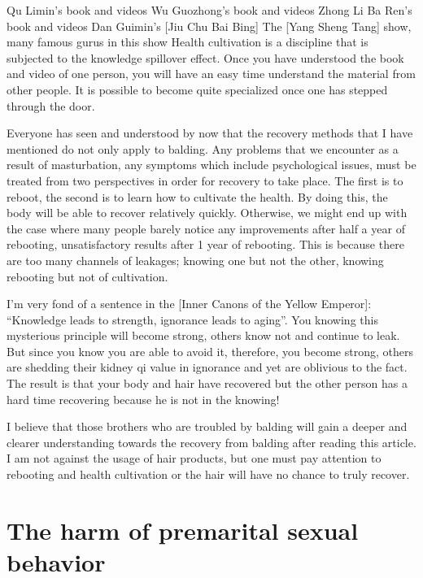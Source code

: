 \documentclass[
]{book}
\begin{document}
Qu Limin's book and videos
Wu Guozhong's book and videos
Zhong Li Ba Ren's book and videos
Dan Guimin's {[}Jiu Chu Bai Bing{]}
The {[}Yang Sheng Tang{]} show, many famous gurus in this show
Health cultivation is a discipline that is subjected to the knowledge spillover effect. Once you have understood the book and video of one person, you will have an easy time understand the material from other people. It is possible to become quite specialized once one has stepped through the door.

Everyone has seen and understood by now that the recovery methods that I have mentioned do not only apply to balding. Any problems that we encounter as a result of masturbation, any symptoms which include psychological issues, must be treated from two perspectives in order for recovery to take place. The first is to reboot, the second is to learn how to cultivate the health. By doing this, the body will be able to recover relatively quickly. Otherwise, we might end up with the case where many people barely notice any improvements after half a year of rebooting, unsatisfactory results after 1 year of rebooting. This is because there are too many channels of leakages; knowing one but not the other, knowing rebooting but not of cultivation.

I'm very fond of a sentence in the {[}Inner Canons of the Yellow Emperor{]}: ``Knowledge leads to strength, ignorance leads to aging''. You knowing this mysterious principle will become strong, others know not and continue to leak. But since you know you are able to avoid it, therefore, you become strong, others are shedding their kidney qi value in ignorance and yet are oblivious to the fact. The result is that your body and hair have recovered but the other person has a hard time recovering because he is not in the knowing!

I believe that those brothers who are troubled by balding will gain a deeper and clearer understanding towards the recovery from balding after reading this article. I am not against the usage of hair products, but one must pay attention to rebooting and health cultivation or the hair will have no chance to truly recover.

\hypertarget{the-harm-of-premarital-sexual-behavior}{%
\chapter{The harm of premarital sexual behavior}\label{the-harm-of-premarital-sexual-behavior}}
\end{document}

